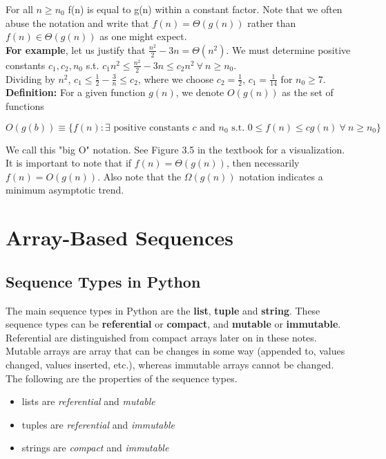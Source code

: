 \documentclass[]{article}
\begin{document}
For all $n \geq n_0$ f(n)  is equal to g(n) within a constant factor. Note that we often abuse the notation and write that $f(n) = \Theta(g(n))$ rather than $f(n) \in \Theta(g(n))$ as one might expect.\\

\textbf{For example}, let us justify that $\frac{n^2}{2} - 3n = \Theta(n^2)$. We must determine positive constants $c_1, c_2, n_0$ s.t. $c_1n^2 \leq \frac{n^2}{2} - 3n \leq c_2 n^2~\forall~n\geq n_0$.\\

Dividing by $n^2$, $c_1 \leq \frac{1}{2} - \frac{3}{n} \leq c_2$, where we choose $c_2 = \frac{1}{2}$, $c_1 = \frac{1}{14}$ for $n_0 \geq 7$. \\

\textbf{Definition:} For a given function $g(n)$, we denote $O(g(n))$ as the set of functions 

\begin{equation*}
	O(g(b)) \equiv \{ f(n): \exists \text{ positive constants } c \text{ and } n_0 \text{ s.t. } 0 \leq f(n) \leq c g(n)~\forall~n \geq n_0 \}
\end{equation*}\bigbreak\bigbreak

We call this "big O" notation. See Figure 3.5 in the textbook for a visualization. It is important to note that if $f(n) = \Theta(g(n))$, then necessarily $f(n) = O(g(n))$. Also note that the $\Omega(g(n))$ notation indicates a minimum asymptotic trend.


\section{Array-Based Sequences}\bigbreak

\subsection{Sequence Types in Python}

The main sequence types in Python are the \textbf{list}, \textbf{tuple} and \textbf{string}. These sequence types can be \textbf{referential} or \textbf{compact}, and \textbf{mutable} or \textbf{immutable}. Referential are distinguished from compact arrays later on in these notes. Mutable arrays are array that can be changes in some way (appended to, values changed, values inserted, etc.), whereas immutable arrays cannot be changed. The following are the properties of the sequence types.

\begin{itemize}
	\item lists are \textit{referential} and \textit{mutable}
	\item tuples are \textit{referential} and \textit{immutable}
	\item strings are \textit{compact} and \textit{immutable}
\end{itemize}
\end{document}
